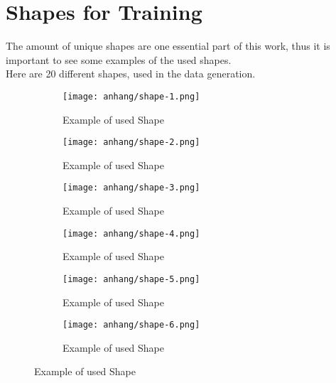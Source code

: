 \chapter{Shapes for Training}
\label{appendix:shapes-for-training}

	The amount of unique shapes are one essential part of this work, thus it is important to see some examples of the used shapes.\\
	Here are 20 different shapes, used in the data generation.
	
	\begin{figure}[h]
		\centering
		\begin{subfigure}{0.45\textwidth}
			\centering
			\texttt{[image: anhang/shape-1.png]}
			\caption[Example of used Shape, created by \cite{Quixel}]{Example of used Shape}
		\end{subfigure}
		\begin{subfigure}{0.45\textwidth}
			\centering
			\texttt{[image: anhang/shape-2.png]}
			\caption[Example of used Shape, created by \cite{Quixel}]{Example of used Shape}
		\end{subfigure}
		
		\begin{subfigure}{0.45\textwidth}
			\centering
			\texttt{[image: anhang/shape-3.png]}
			\caption[Example of used Shape, created by \cite{Quixel}]{Example of used Shape}
		\end{subfigure}
		\begin{subfigure}{0.45\textwidth}
			\centering
			\texttt{[image: anhang/shape-4.png]}
			\caption[Example of used Shape, created by \cite{Quixel}]{Example of used Shape}
		\end{subfigure}
		
		\begin{subfigure}{0.45\textwidth}
			\centering
			\texttt{[image: anhang/shape-5.png]}
			\caption[Example of used Shape, created by \cite{Quixel}]{Example of used Shape}
		\end{subfigure}
		\begin{subfigure}{0.45\textwidth}
			\centering
			\texttt{[image: anhang/shape-6.png]}
			\caption[Example of used Shape, created by \cite{Quixel}]{Example of used Shape}
		\end{subfigure}
	
	\end{figure}
	
	
	
